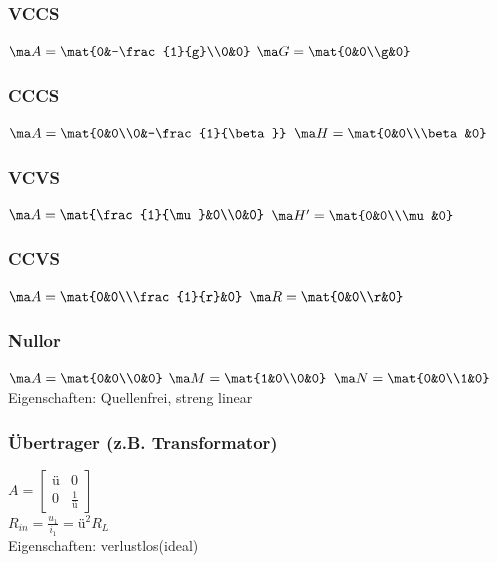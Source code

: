 \documentclass[fs, footer]{latex4ei}
\begin{document}
\begin{multicols*}{4}
    \subsubsection{VCCS}
    $\ma A = \mat{0&-\frac{1}{g}\\0&0}$\quad
    $\ma G = \mat{0&0\\g&0}$
    \subsubsection{CCCS}
    $\ma A = \mat{0&0\\0&-\frac{1}{\beta}}$\quad
    $\ma H = \mat{0&0\\\beta&0}$
    \subsubsection{VCVS}
    $\ma A = \mat{\frac{1}{\mu}&0\\0&0}$\quad
    $\ma H' = \mat{0&0\\\mu&0}$
    \subsubsection{CCVS}
    $\ma A = \mat{0&0\\\frac{1}{r}&0}$\quad
    $\ma R = \mat{0&0\\r&0}$

    \subsubsection{Nullor}
    $\ma A = \mat{0&0\\0&0}$\quad
    $\ma M = \mat{1&0\\0&0}$\quad
    $\ma N = \mat{0&0\\1&0}$\\
    Eigenschaften: Quellenfrei, streng linear

    \subsubsection{Übertrager (z.B. Transformator)}
    $A=\begin{bmatrix} \text{ü} & 0 \\ 0 & \frac{1}{\text{ü}} \end{bmatrix}$\\
    $R_{in}=\frac{u_1}{i_1}=\text{ü}^2 R_L$\\
    Eigenschaften: verlustlos(ideal)



\end{multicols*}
\end{document}
